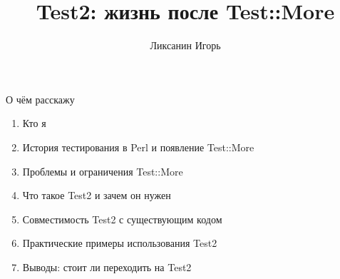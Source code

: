 

\title{Test2: жизнь после Test::More}
\author{Ликсанин Игорь}

\titleframe

\begin{frame}[fragile]{О чём расскажу}
    \begin{enumerate}
        \item Кто я
        \vspace{0.25em}
        \item История тестирования в Perl и появление Test::More
        \vspace{0.25em}
        \item Проблемы и ограничения Test::More
        \vspace{0.25em}
        \item Что такое Test2 и зачем он нужен
        \vspace{0.25em}
        \item Совместимость Test2 с существующим кодом
        \vspace{0.25em}
        \item Практические примеры использования Test2
        \vspace{0.25em}
        \item Выводы: стоит ли переходить на Test2
    \end{enumerate}
\end{frame}


